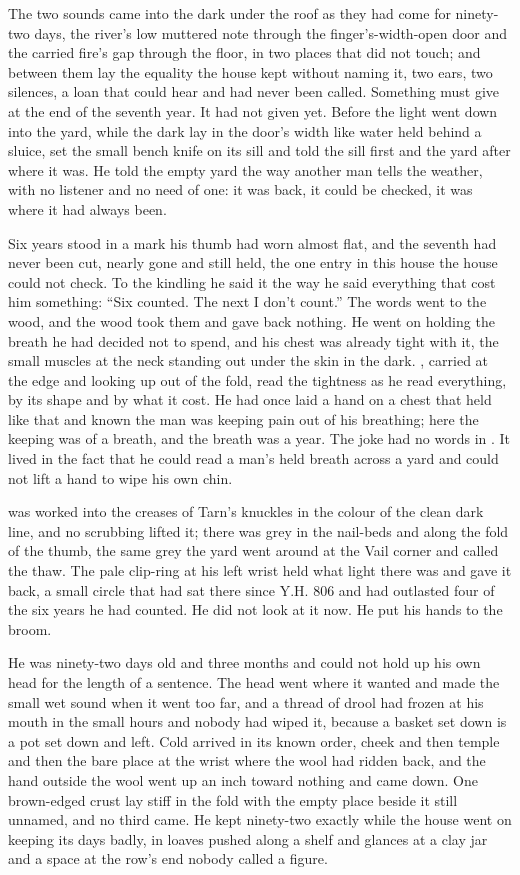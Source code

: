 The two sounds came into the dark under the roof as they had come for ninety-two days, the river’s low muttered note through the finger’s-width-open door and the carried fire’s gap through the floor, in two places that did not touch; and between them lay the equality the house kept without naming it, two ears, two silences, a loan that could hear and had never been called. Something must give at the end of the seventh year. It had not given yet. Before the light went down into the yard, while the dark lay in the door’s width like water held behind a sluice,  set the small bench knife on its sill and told the sill first and the yard after where it was. He told the empty yard the way another man tells the weather, with no listener and no need of one: it was back, it could be checked, it was where it had always been.

Six years stood in a mark his thumb had worn almost flat, and the seventh had never been cut, nearly gone and still held, the one entry in this house the house could not check. To the kindling he said it the way he said everything that cost him something: “Six counted. The next I don’t count.” The words went to the wood, and the wood took them and gave back nothing. He went on holding the breath he had decided not to spend, and his chest was already tight with it, the small muscles at the neck standing out under the skin in the dark. , carried at the edge and looking up out of the fold, read the tightness as he read everything, by its shape and by what it cost. He had once laid a hand on a chest that held like that and known the man was keeping pain out of his breathing; here the keeping was of a breath, and the breath was a year. The joke had no words in . It lived in the fact that he could read a man’s held breath across a yard and could not lift a hand to wipe his own chin.

 was worked into the creases of Tarn’s knuckles in the colour of the clean dark line, and no scrubbing lifted it; there was grey in the nail-beds and along the fold of the thumb, the same grey the yard went around at the Vail corner and called the thaw. The pale clip-ring at his left wrist held what light there was and gave it back, a small circle that had sat there since Y.H. 806 and had outlasted four of the six years he had counted. He did not look at it now. He put his hands to the broom.

He was ninety-two days old and three months and could not hold up his own head for the length of a sentence. The head went where it wanted and made the small wet sound when it went too far, and a thread of drool had frozen at his mouth in the small hours and nobody had wiped it, because a basket set down is a pot set down and left. Cold arrived in its known order, cheek and then temple and then the bare place at the wrist where the wool had ridden back, and the hand outside the wool went up an inch toward nothing and came down. One brown-edged crust lay stiff in the fold with the empty place beside it still unnamed, and no third came. He kept ninety-two exactly while the house went on keeping its days badly, in loaves pushed along a shelf and glances at a clay jar and a space at the row’s end nobody called a figure.


